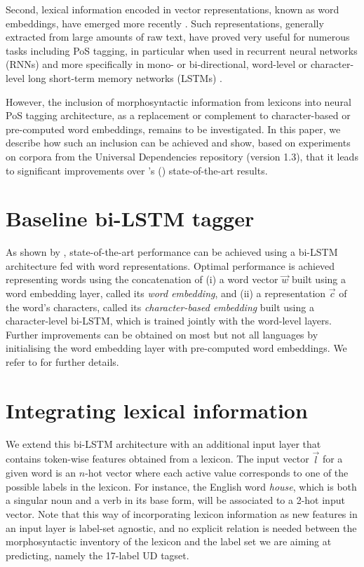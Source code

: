 \documentclass[11pt,letterpaper]{article}
\begin{document}
Second, lexical information encoded in vector representations, known as word embeddings, have emerged more
recently \cite{bengio03,collobert08,chrupala13,ling15,ballesteros15,muller15}. Such representations, generally
extracted from large amounts of raw text, have proved very useful for numerous tasks including PoS tagging, in
particular when used in recurrent neural networks (RNNs) and more specifically in mono- or bi-directional, word-level or
character-level long short-term memory networks (LSTMs) \cite{hochreiter97,ling15,ballesteros15,plank16}.

However, the inclusion of morphosyntactic information from  lexicons into neural PoS tagging architecture, as a
replacement or complement to character-based or pre-computed word embeddings, remains to be investigated. In this paper,
we describe how such an inclusion can be achieved and show, based on experiments on corpora from the Universal
Dependencies repository (version 1.3), that it leads to significant improvements over \citeauthor{plank16}'s
(\citeyear{plank16}) state-of-the-art results.


\section{Baseline bi-LSTM tagger}
\label{sec:baselinearchitecture}
As shown by \citet{plank16}, state-of-the-art performance can be achieved using a bi-LSTM architecture fed with word
representations. Optimal performance is achieved representing words using the concatenation of (i) a word vector
$\vec{w}$ built using a word embedding layer, called its {\em word embedding}, and (ii) a representation $\vec{c}$ of
the word's characters, called its {\em character-based embedding} built using a character-level bi-LSTM, which is
trained jointly with the word-level layers. Further improvements can be obtained on most but not all languages by
initialising the word embedding layer with pre-computed word embeddings. We refer to \citet{plank16} for further details.

\section{Integrating lexical information}

We extend this bi-LSTM architecture with an additional input layer that
contains token-wise features obtained from a lexicon. The input vector $\vec{l}$ for a given word is an $n$-hot vector
where each active value corresponds to one of the possible labels in the lexicon. For instance, the English word
\textit{house}, which is both a singular noun and a verb in its base form, will be associated to a 2-hot input
vector.  Note that this way of incorporating lexicon information as new features in an input layer is label-set
agnostic, and no explicit relation is needed between the morphosyntactic inventory of the lexicon and the label set we
are aiming at predicting, namely the 17-label UD tagset.
\end{document}
